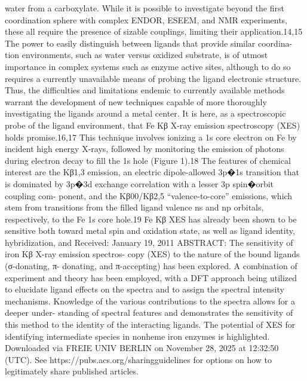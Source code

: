 water from a carboxylate. While it is possible to investigate
beyond the ﬁrst coordination sphere with complex ENDOR,
ESEEM, and NMR experiments, these all require the presence of
sizable couplings, limiting their application.14,15 The power to
easily distinguish between ligands that provide similar coordina-
tion environments, such as water versus oxidized substrate, is of
utmost importance in complex systems such as enzyme active
sites, although to do so requires a currently unavailable means of
probing the ligand electronic structure. Thus, the diﬃculties and
limitations endemic to currently available methods warrant the
development of new techniques capable of more thoroughly
investigating the ligands around a metal center.
It is here, as a spectroscopic probe of the ligand environment,
that Fe Kβ X-ray emission spectroscopy (XES) holds promise.16,17
This technique involves ionizing a 1s core electron on Fe by
incident high energy X-rays, followed by monitoring the emission
of photons during electron decay to ﬁll the 1s hole (Figure 1).18
The features of chemical interest are the Kβ1,3 emission, an electric
dipole-allowed 3p�1s transition that is dominated by 3p�3d
exchange correlation with a lesser 3p spin�orbit coupling com-
ponent, and the Kβ00/Kβ2,5 “valence-to-core” emissions, which
stem from transitions from the ﬁlled ligand valence ns and np
orbitals, respectively, to the Fe 1s core hole.19 Fe Kβ XES has
already been shown to be sensitive both toward metal spin and
oxidation state, as well as ligand identity, hybridization, and
Received:
January 19, 2011
ABSTRACT: The sensitivity of iron Kβ X-ray emission spectros-
copy (XES) to the nature of the bound ligands (σ-donating, π-
donating, and π-accepting) has been explored. A combination of
experiment and theory has been employed, with a DFT approach
being utilized to elucidate ligand eﬀects on the spectra and to
assign the spectral intensity mechanisms. Knowledge of the
various contributions to the spectra allows for a deeper under-
standing of spectral features and demonstrates the sensitivity of
this method to the identity of the interacting ligands. The potential
of XES for identifying intermediate species in nonheme iron
enzymes is highlighted.
Downloaded via FREIE UNIV BERLIN on November 28, 2025 at 12:32:50 (UTC).
See https://pubs.acs.org/sharingguidelines for options on how to legitimately share published articles.



